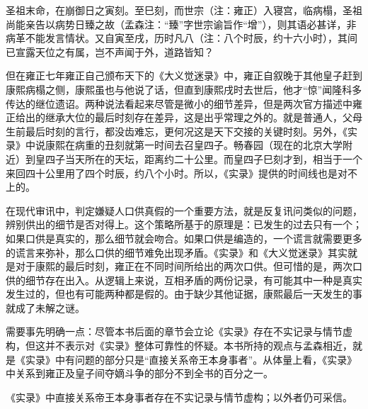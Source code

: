 
\begin{bookquote}圣祖末命，在崩御日之寅刻。至巳刻，而世宗（注：雍正）入寝宫，临病榻，圣祖尚能亲告以病势日臻之故（孟森注：“臻”字世宗谕旨作“增”），则其语必甚详，非病革不能发言情状。又自寅至戌，历时凡八（注：八个时辰，约十六小时），其间已宣露天位之有属，岂不声闻于外，道路皆知？\end{bookquote}


但在雍正七年雍正自己颁布天下的《大义觉迷录》中，雍正自叙晚于其他皇子赶到康熙病榻之侧，康熙虽也与他说了话，但直到康熙戌时去世后，他才“惊”闻隆科多传达的继位遗诏。两种说法看起来尽管是微小的细节差异，但是两次官方描述中雍正给出的继承大位的最后时刻存在差异，这是出乎常理之外的。就是普通人，父母生前最后时刻的言行，都没齿难忘，更何况这是天下交接的关键时刻。另外，《实录》中说康熙在病重的丑刻就第一时间去召皇四子。畅春园（现在的北京大学附近）到皇四子当天所在的天坛，距离约二十公里。而皇四子巳刻才到，相当于一个来回四十公里用了四个时辰，约八个小时。所以，《实录》提供的时间线也是对不上的。

在现代审讯中，判定嫌疑人口供真假的一个重要方法，就是反复讯问类似的问题，辨别供出的细节是否对得上。这个策略所基于的原理是：已发生的过去只有一个；如果口供是真实的，那么细节就会吻合。如果口供是编造的，一个谎言就需要更多的谎言来弥补，那么口供的细节难免出现矛盾。《实录》和《大义觉迷录》其实就是对于康熙的最后时刻，雍正在不同时间所给出的两次口供。但可惜的是，两次口供的细节存在出入。从逻辑上来说，互相矛盾的两份记录，有可能其中一种是真实发生过的，但也有可能两种都是假的。由于缺少其他证据，康熙最后一天发生的事就成了未解之谜。



需要事先明确一点：尽管本书后面的章节会立论《实录》存在不实记录与情节虚构，但这并不表示对《实录》整体可靠性的怀疑。本书所持的观点与孟森相近，就是《实录》中有问题的部分只是“直接关系帝王本身事者”。从体量上看，《实录》中关系到雍正及皇子间夺嫡斗争的部分不到全书的百分之一。

\begin{law}\label{thm:shilu}
《实录》中直接关系帝王本身事者存在不实记录与情节虚构；以外者仍可采信。
\end{law}

